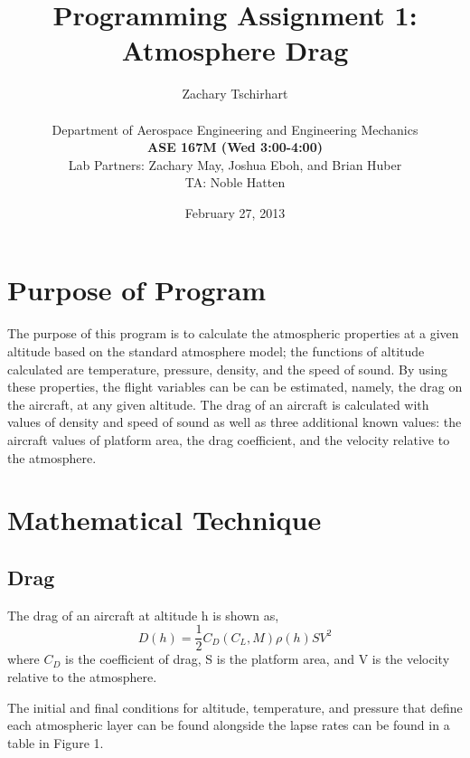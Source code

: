 \documentclass[12pt]{report}
\title{Programming Assignment 1: Atmosphere Drag}
\author{Zachary Tschirhart \\
	\small \\
	\small Department of Aerospace Engineering and Engineering Mechanics \\
	\small \textbf{ASE 167M (Wed 3:00-4:00)} \\
	\small Lab Partners: Zachary May, Joshua Eboh, and Brian Huber \\
	\small
	\small TA: Noble Hatten}
\date{February 27, 2013}
\begin{document}
\maketitle


\tableofcontents
\pagebreak

\setcounter{secnumdepth}{0}





\section{Purpose of Program}
\doublespacing
The purpose of this program is to calculate the atmospheric properties at a given altitude based on the standard atmosphere model; the functions of altitude calculated are temperature, pressure, density, and the speed of sound. By using these properties, the flight variables can be can be estimated, namely, the drag on the aircraft, at any given altitude. The drag of an aircraft is calculated with values of density and speed of sound as well as three additional known values: the aircraft values of platform area, the drag coefficient, and the velocity relative to the atmosphere.






\section{Mathematical Technique}
\doublespacing
\subsection{Drag}
The drag of an aircraft at altitude h is shown as,
\begin{equation}
	D(h) = \frac{1}{2}C_{D}(C_{L},M)\rho(h)SV^2
	\label{equation:drag}
\end{equation}
where \(C_{D}\) is the coefficient of drag, S is the platform area, and V is the velocity relative to the atmosphere.

The initial and final conditions for altitude, temperature, and pressure that define each atmospheric layer can be found alongside the lapse rates can be found in a table in Figure 1.
\end{document}
